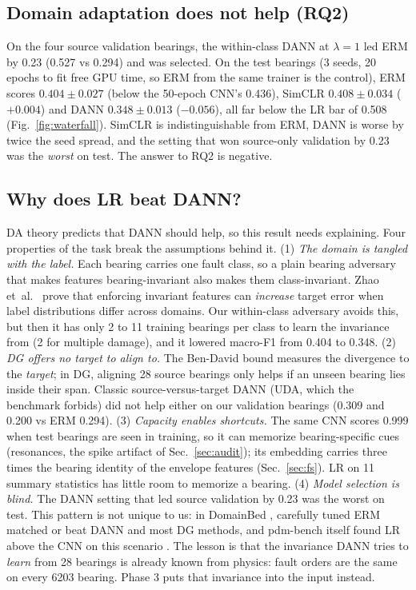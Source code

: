 \documentclass[conference]{IEEEtran}
\newcommand{\mF}{macro-F1}
\begin{document}
\subsection{Domain adaptation does not help (RQ2)}\label{sec:da}
On the four source validation bearings, the within-class DANN at $\lambda=1$ led ERM by 0.23
(0.527 vs 0.294) and was selected. On the test bearings (3 seeds, 20 epochs to fit free GPU
time, so ERM from the same trainer is the control), ERM scores $0.404\pm0.027$ (below the 50-epoch CNN's 0.436), SimCLR
$0.408\pm0.034$ ($+0.004$) and DANN $0.348\pm0.013$ ($-0.056$), all far below the LR bar of
0.508 (Fig.~\ref{fig:waterfall}). SimCLR is indistinguishable from ERM, DANN is worse by twice
the seed spread, and the setting that won source-only validation by 0.23 was the \emph{worst} on
test. The answer to RQ2 is negative.

\subsection{Why does LR beat DANN?}\label{sec:why}
DA theory predicts that DANN should help, so this result needs explaining. Four properties of
the task break the assumptions behind it.
(1) \emph{The domain is tangled with the label.} Each bearing carries one fault class, so a plain
bearing adversary that makes features bearing-invariant also makes them class-invariant. Zhao
et~al.\ \cite{zhao2019} prove that enforcing invariant features can \emph{increase} target error
when label distributions differ across domains. Our within-class adversary avoids this, but
then it has only 2 to 11 training bearings per class to learn the invariance from (2 for
multiple damage), and it lowered \mF{} from 0.404 to 0.348.
(2) \emph{DG offers no target to align to.} The Ben-David bound \cite{bendavid2010} measures the
divergence to the \emph{target}; in DG, aligning 28 source bearings only helps if an unseen
bearing lies inside their span. Classic source-versus-target DANN (UDA, which the benchmark
forbids) did not help either on our validation bearings (0.309 and 0.200 vs ERM 0.294).
(3) \emph{Capacity enables shortcuts.} The same CNN scores 0.999 when test bearings are seen in
training, so it can memorize bearing-specific cues (resonances, the spike artifact of
Sec.~\ref{sec:audit}); its embedding carries three times the bearing identity of the envelope
features (Sec.~\ref{sec:fs}). LR on 11 summary statistics has little room to memorize a bearing.
(4) \emph{Model selection is blind.} The DANN setting that led source validation by 0.23 was the
worst on test. This pattern is not unique to us: in DomainBed \cite{gulrajani2021}, carefully
tuned ERM matched or beat DANN and most DG methods, and pdm-bench itself found LR above the CNN on
this scenario \cite{knap2026}.
The lesson is that the invariance DANN tries to \emph{learn} from 28 bearings is already known
from physics: fault orders are the same on every 6203 bearing. Phase 3 puts that invariance into
the input instead.
\end{document}
